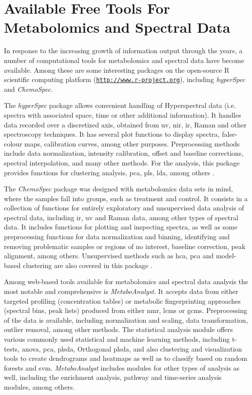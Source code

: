 
\section{Available Free Tools For Metabolomics and Spectral Data} \label{met_tools}

In response to the increasing growth of information output through the years, a number of computational tools for metabolomics and spectral data have become available. Among these are some interesting packages on the open-source R scientific computing platform (\href{http://www.r-project.org}{\nolinkurl{http://www.r-project.org}}), including \textit{hyperSpec} and \textit{ChemoSpec}. 

The \textit{hyperSpec} package allows convenient handling of Hyperspectral data (i.e. spectra with associated space, time or other additional information). It handles data recorded over a discretized axis, obtained from \gls{uv}, \gls{nir}, \gls{ir}, Raman and other spectroscopy techniques. It has several plot functions to display spectra, false-colour maps, calibration curves, among other purposes. Preprocessing methods include data normalization, intensity calibration, offset and baseline corrections, spectral interpolation, and many other methods. For the analysis, this package provides functions for clustering analysis, \gls{pca}, \gls{pls}, \gls{lda}, among others \citep{hyperspec}.

The \textit{ChemoSpec} package was designed with metabolomics data sets in mind, where the samples fall into groups, such as treatment and control. It consists in a collection of functions for entirely exploratory and unsupervised data analysis of spectral data, including \gls{ir}, \gls{uv} and Raman data, among other types of spectral data. It includes functions for plotting and inspecting spectra, as well as some preprocessing functions for data normalization and binning, identifying and removing problematic samples or regions of no interest, baseline correction, peak alignment, among others. Unsupervised methods such as \gls{hca}, \gls{pca} and model-based clustering are also covered in this package \citep{chemospec}.

Among web-based tools available for metabolomics and spectral data analysis the most notable and comprehensive is \textit{MetaboAnalyst}. It accepts data from either targeted profiling (concentration tables) or metabolic fingerprinting approaches (spectral bins, peak lists) produced from either \gls{nmr}, \gls{lcms} or \gls{gcms}. Preprocessing of the data is available, including normalization and scaling, data transformation, outlier removal, among other methods. The statistical analysis module offers various commonly used statistical and machine learning methods, including t-tests, \gls{anova}, \gls{pca}, \gls{plsda}, Orthogonal \gls{plsda}, and also clustering and visualization tools to create dendrograms and heatmaps as well as to classify based on random forests and \gls{svm}. \textit{MetaboAnalyst} includes modules for other types of analysis as well, including the enrichment analysis, pathway and time-series analysis modules, among others. 

